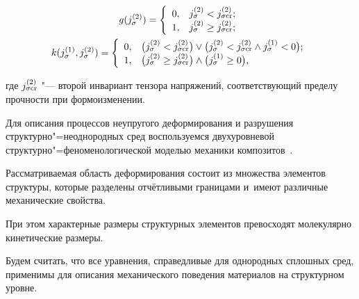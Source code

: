 \begin{gather*}

g ( j^{(2)}_{\sigma}) = \left\{

  {{\begin{array}{cl}

    0, & j^{(2)}_{\sigma} < j^{(2)}_{\sigma \rm cr}; \\

    1, & j^{(2)}_{\sigma} \ge j^{(2)}_{\sigma \rm cr};\\

  \end{array} }} \right.

\\

k ( j^{(1)}_{\sigma}, j^{(2)}_{\sigma}) = \left\{

  {{\begin{array}{cl}

   0, & \bigl( j^{(2)}_{\sigma} < j^{(2)}_{\sigma\rm cr} \bigr) \vee \bigl( j^{(2)}_{\sigma} < j^{(2)}_{\sigma \rm cr} \wedge j^{(1)}_{\sigma} < 0 \bigr);\\

   1, & \bigl(j^{(2)}_{\sigma} \ge j^{(2)}_{\sigma \rm cr}\bigr) \wedge \bigl(j^{(1)}_{\sigma} \ge 0 \bigr),\\

  \end{array} }} \right. 

\end{gather*}

где $ j^{(2)}_{\sigma \rm cr}$ "--- второй инвариант тензора напряжений, соответствующий пределу прочности при формоизменении.



Для описания процессов неупругого деформирования и разрушения структурно"=неоднородных сред воспользуемся двухуровневой структурно"=феноменологической моделью механики композитов~\cite{Ilinykh:bib:Wildeman}. 

Рассматриваемая область деформирования состоит из множества элементов структуры, которые разделены отчётливыми границами и~имеют различные механические свойства. 

При этом характерные размеры структурных элементов превосходят молекулярно кинетические размеры.



Будем считать, что все уравнения, справедливые для однородных сплошных сред, применимы для описания механического поведения материалов на структурном уровне. 

